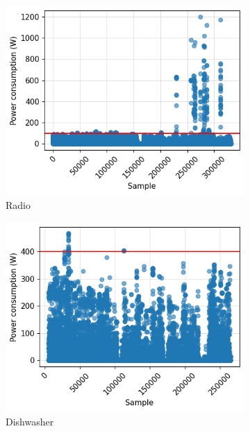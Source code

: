 \begin{figure}
  \begin{subfigure}{.5\textwidth}
    \centering
    \includegraphics[width=.9\linewidth]{images/raw_consumptions/audio_amplifier.png}
    \caption{Radio}
    \label{fig:radio}
  \end{subfigure}%
  \begin{subfigure}{.5\textwidth}
    \centering
    \includegraphics[width=.9\linewidth]{images/raw_consumptions/dish_washer.png}
    \caption{Dishwasher}
    \label{fig:dish_washer}
  \end{subfigure}
  \begin{subfigure}{.5\textwidth}
    \centering

\end{subfigure}
\end{figure}
